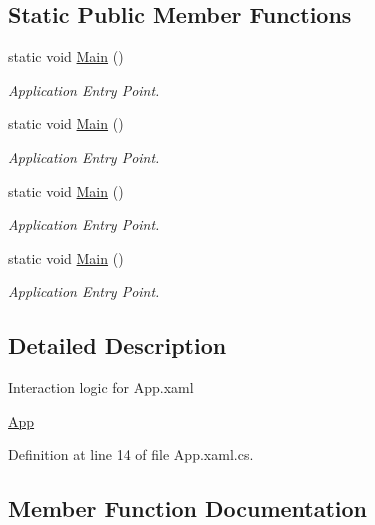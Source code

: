 \subsection*{Static Public Member Functions}
\begin{DoxyCompactItemize}
\item 
static void \hyperlink{class_c_p_u___o_s___simulator_1_1_app_a7bbb69f458b77923e336283b1653ce69}{Main} ()
\begin{DoxyCompactList}\small\item\em Application Entry Point. \end{DoxyCompactList}\item 
static void \hyperlink{class_c_p_u___o_s___simulator_1_1_app_a7bbb69f458b77923e336283b1653ce69}{Main} ()
\begin{DoxyCompactList}\small\item\em Application Entry Point. \end{DoxyCompactList}\item 
static void \hyperlink{class_c_p_u___o_s___simulator_1_1_app_a7bbb69f458b77923e336283b1653ce69}{Main} ()
\begin{DoxyCompactList}\small\item\em Application Entry Point. \end{DoxyCompactList}\item 
static void \hyperlink{class_c_p_u___o_s___simulator_1_1_app_a7bbb69f458b77923e336283b1653ce69}{Main} ()
\begin{DoxyCompactList}\small\item\em Application Entry Point. \end{DoxyCompactList}\end{DoxyCompactItemize}


\subsection{Detailed Description}
Interaction logic for App.\+xaml 

\hyperlink{class_c_p_u___o_s___simulator_1_1_app}{App} 

Definition at line 14 of file App.\+xaml.\+cs.



\subsection{Member Function Documentation}
\hypertarget{class_c_p_u___o_s___simulator_1_1_app_a15e2e0e02c8dbe7d5d3fba5d21f3e56f}{}
